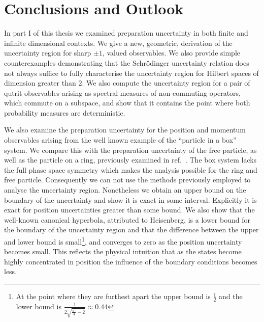 \let\textcircled=\pgftextcircled
\chapter{Conclusions and Outlook} \label{chap:conclusion}


In part I of this thesis we examined preparation uncertainty in both finite and infinite dimensional contexts. We give a new, geometric, derivation of the uncertainty region for sharp $\pm 1$, valued observables. We also provide simple counterexamples demonstrating that the Schr{\"o}dinger uncertainty relation does not always suffice to fully characterise the uncertainty region for Hilbert spaces of dimension greater than $2$. We also compute the uncertainty region for a pair of qutrit observables arising as spectral measures of non-commuting operators, which commute on a subspace, and show that it contains the point where both probability measures are deterministic.

We also examine the preparation uncertainty for the position and momentum observables arising from the well known example of the ``particle in a box'' system. We compare this with the preparation uncertainty of the free particle, as well as the particle on a ring, previously examined in ref.~\cite{sharp-ur-num-angle}. The box system lacks the full phase space symmetry which makes the analysis possible for the ring and free particle. Consequently we can not use the methods previously employed to analyse the uncertainty region. Nonetheless we obtain an upper bound on the boundary of the uncertainty and show it is exact in some interval. Explicitly it is exact for position uncertainties greater than some bound. We also show that the well-known canonical hyperbola, attributed to Heisenberg, is a lower bound for the boundary of the uncertainty region and that the difference between the upper and lower bound is small\footnote{At the point where they are furthest apart the upper bound is $\frac{1}{2}$ and the lower bound is $\frac{1}{2\sqrt{\frac{\pi^2}{3} -2}}\approx 0.44$}, and converges to zero as the position uncertainty becomes small. This reflects the physical intuition that as the states become highly concentrated in position the influence of the boundary conditions becomes less.


